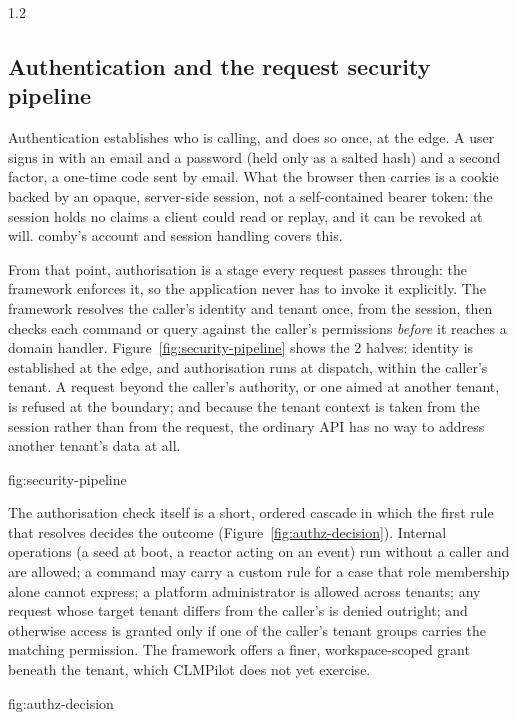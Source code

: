 \begin{spacing}{1.2}
\subsection{Authentication and the request security pipeline}
\label{sec:security-pipeline}

Authentication establishes who is calling, and does so once, at the edge. A
user signs in with an email and a password (held only as a salted hash) 
and a second factor, a one-time code sent by email. What the browser then carries is a
cookie backed by an opaque, server-side session, not a self-contained bearer
token: the session holds no claims a client could read or replay, and it can
be revoked at will. comby's account and session handling covers this.

From that point, authorisation is a stage every request passes through: the
framework enforces it, so the application never has to invoke it explicitly. The framework resolves the
caller's identity and tenant once, from the session, then checks each command
or query against the caller's permissions \emph{before} it reaches a domain
handler. Figure~\ref{fig:security-pipeline} shows the 2 halves: identity is
established at the edge, and authorisation runs at dispatch, within the
caller's tenant. A request beyond the caller's authority, or one aimed at
another tenant, is refused at the boundary; and because the tenant context
is taken from the session rather than from the request, the ordinary API
has no way to address another tenant's data at all.

{fig:security-pipeline}

The authorisation check itself is a short, ordered cascade in which the first
rule that resolves decides the outcome (Figure~\ref{fig:authz-decision}).
Internal operations (a seed at boot, a reactor acting on an event) run
without a caller and are allowed; a command may carry a custom rule for a case
that role membership alone cannot express; a platform administrator is allowed
across tenants; any request whose target tenant differs from the caller's is
denied outright; and otherwise access is granted only if one of the caller's
tenant groups carries the matching permission. The framework offers a finer,
workspace-scoped grant beneath the tenant, which CLMPilot does not yet
exercise.

{fig:authz-decision}


\end{spacing}
